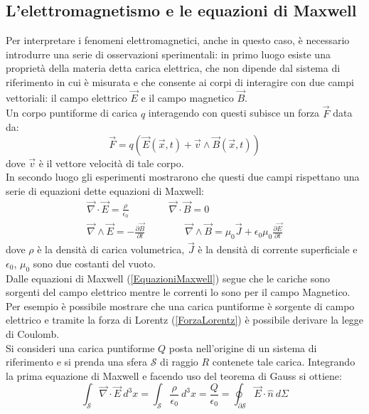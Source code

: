 \subsection{L'elettromagnetismo e le equazioni di Maxwell}
Per interpretare i fenomeni elettromagnetici, anche in questo caso, è necessario introdurre
una serie di osservazioni sperimentali: in primo luogo esiste una proprietà della materia 
detta carica elettrica, che non dipende dal sistema di riferimento in cui è misurata e che consente 
ai corpi di interagire con due campi vettoriali: 
il campo elettrico $\vec{E}$ e il campo magnetico $\vec{B}$.\\ Un corpo puntiforme di carica 
$q$ interagendo con questi subisce un forza $\vec{F}$ data da:
\begin{equation}
	\vec{F}=q(\vec{E}(\vec{x},t)+\vec{v}\wedge\vec{B}(\vec{x},t))
	\label{ForzaLorentz}
\end{equation}
dove $\vec{v}$ è il vettore velocità di tale corpo.\\
In secondo luogo gli esperimenti mostrarono che questi due campi rispettano una serie di equazioni 
dette equazioni di Maxwell:
\begin{equation}
	\begin{gathered}
		\vec{\nabla}\cdot\vec{E}=\frac{\rho}{\epsilon_0} \qquad \qquad \vec{\nabla}\cdot\vec{B}=0 \\
		\vec{\nabla}\wedge\vec{E}=-\frac{\partial\vec{B}}{\partial t} \qquad \qquad \vec{\nabla}\wedge
		\vec{B}=\mu_0\vec{J}+\epsilon_0\mu_0\frac{\partial\vec{E}}{\partial t}
		\label{EquazioniMaxwell}
	\end{gathered}
\end{equation}
dove $\rho$ è la densità di carica volumetrica, $\vec{J}$ è la densità di corrente superficiale e 
$\epsilon_0$, $\mu_0$ sono due costanti del vuoto.\\
Dalle equazioni di Maxwell (\ref{EquazioniMaxwell}) segue che le cariche sono sorgenti del campo 
elettrico mentre le correnti lo sono per 
il campo Magnetico. Per esempio è possibile mostrare che una carica puntiforme è sorgente di campo elettrico e 
tramite la forza di Lorentz (\ref{ForzaLorentz}) è possibile derivare la legge di Coulomb.\\
Si consideri una carica puntiforme $Q$ posta nell'origine di un sistema di riferimento e si prenda una sfera $\mathcal{S}$ di raggio $R$ 
contenete tale carica. Integrando la prima equazione di Maxwell e facendo uso del teorema di Gauss si ottiene:
\begin{equation*}
	\int_\mathcal{S}\vec{\nabla}\cdot\vec{E}\ d^3x=\int_\mathcal{S}\frac{\rho}{\epsilon_0}\ d^3x=\frac{Q}{\epsilon_0}=\oint_{\partial\mathcal{S}}\vec{E}\cdot\hat{n}\ d\Sigma
\end{equation*}
